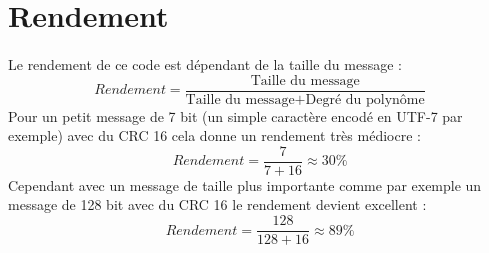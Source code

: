     \section{Rendement}

        \paragraph{}
Le rendement de ce code est dépendant de la taille du message :
\[  Rendement = \frac{\text{Taille du message}}{\text{Taille du message} + \text{Degré du polynôme}} \]
Pour un petit message de 7 bit (un simple caractère encodé en UTF-7 par exemple) avec du CRC 16 cela donne un rendement très médiocre :
\[  Rendement = \frac{7}{7 + 16} \approx 30\%  \]
Cependant avec un message de taille plus importante comme par exemple un message de 128 bit avec du CRC 16 le rendement devient excellent :
\[  Rendement = \frac{128}{128 + 16} \approx 89\%  \]
